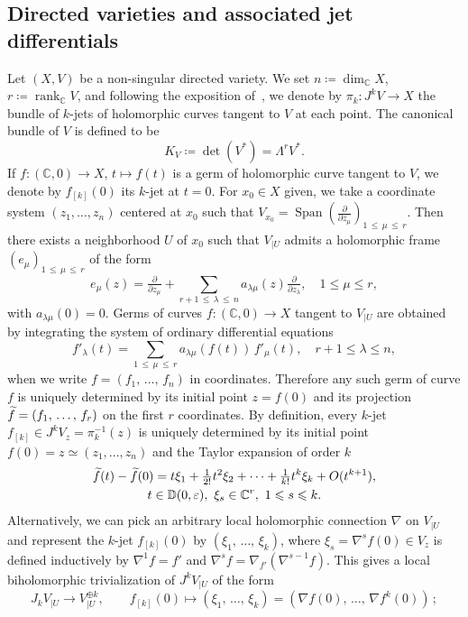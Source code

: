 \documentclass[AHL,Unicode,longabstracts,published]{cedram}
\DeclareMathOperator{\Span}{Span}
\DeclareMathOperator{\rank}{rank}
\newcommand*\bC{\mathbb{C}}
\newcommand*\bD{\mathbb{D}}
\let\leq\leqslant
\newcommand*\bydef{\coloneqq}
\let\oldtilde\tilde
\renewcommand*{\tilde}[1]{\mathchoice{\widetilde{#1}}{\widetilde{#1}}{\oldtilde{#1}}{\oldtilde{#1}}}
\begin{document}
\subsection{Directed varieties and associated jet differentials}
Let $(X,V)$ be a non-singular directed variety. We set $n\bydef\dim_\bC X$,
$r\bydef\rank_\bC V$, and following the exposition of~\cite{Dem97}, we denote by $\pi_k\colon J^kV\to X$ the bundle of $k$-jets of holomorphic curves tangent to
$V$ at each point. The canonical bundle of $V$ is defined to be
\[
K_V
\bydef
\det(V^*) =
\Lambda^rV^*.
\]
If $f\colon(\bC,0)\to X$, $t\mapsto f(t)$ is a germ of holomorphic curve tangent to $V$, we denote by $f_{[k]}(0)$ its $k$-jet at $t=0$. For $x_0\in X$ given, we take a coordinate system $(z_1,\dotsc,z_n)$ centered at $x_0$ such that
$V_{x_0}=\Span(\tfrac{\partial}{\partial z_\mu})_{1\,\leq \,\mu\,\leq\,r}$. Then there exists a neighborhood $U$ of $x_0$ such that
$V_{|U}$ admits a holomorphic frame $(e_\mu)_{1\,\leq\,\mu\,\leq\,r}$ of the form
\[
e_\mu(z)=\tfrac{\partial}{\partial z_\mu}+\sum_{r+1\,\leq \,\lambda\,\leq\,n} a_{\lambda\mu}(z)\tfrac{\partial}{\partial z_\lambda},\quad 1\leq\mu\leq r,
\]
with $a_{\lambda\mu}(0)=0$. Germs of curves $f\colon(\bC,0)\to X$ tangent to $V_{|U}$ are obtained by integrating the system of ordinary differential equations
\[
f'_\lambda(t)=\sum_{1\,\leq\,\mu\,\leq\,r}a_{\lambda\mu}(f(t))\,f'_\mu(t),\quad r+1\leq \lambda\leq n,
\]
when we write $f=(f_1,\,\dotsc,\,f_n)$ in coordinates. Therefore any such germ of curve $f$ is uniquely determined by its initial point $z=f(0)$ and its projection $\tilde f=(f_1,\,\dotsc,\,f_r)$ on the first $r$ coordinates. By definition, every $k$-jet $f_{[k]}\in J^kV_z=\pi_k^{-1}(z)$ is uniquely determined by its initial point $f(0)=z\simeq(z_1,\dotsc,z_n)$ and the Taylor expansion of order $k$
\begin{multline}\label{eq:Taylor}
\tilde f(t)-\tilde f(0)=t\xi_1+\tfrac{1}{ 2!}t^2\xi_2+\cdots+\tfrac{1}{ k!} t^k\xi_k+O(t^{k+1}),\\
 t\in\bD(0,\varepsilon),~\xi_s\in\bC^r,~1\leq s\leq k.
\end{multline}
Alternatively, we can pick an arbitrary local holomorphic connection $\nabla$ on $V_{|U}$ and represent the $k$-jet $f_{[k]}(0)$ by
$(\xi_1,\,\dotsc,\,\xi_k)$, where
$\xi_s=\nabla^sf(0)\in V_z$ is defined inductively by $\nabla^1 f=f'$ and $\nabla^sf=\nabla_{f'}(\nabla^{s-1}f)$. This gives a local biholomorphic trivialization of $J^kV_{|U}$ of the form
\begin{equation}\label{eq:triv}
J_kV_{|U}\to V_{|U}^{\oplus k},\qquad f_{[k]}(0)\mapsto(\xi_1,\,\dotsc,\,\xi_k)=\left(\nabla f(0),\,\dotsc,\,\nabla f^k(0)\right)\,;
\end{equation}
\end{document}
